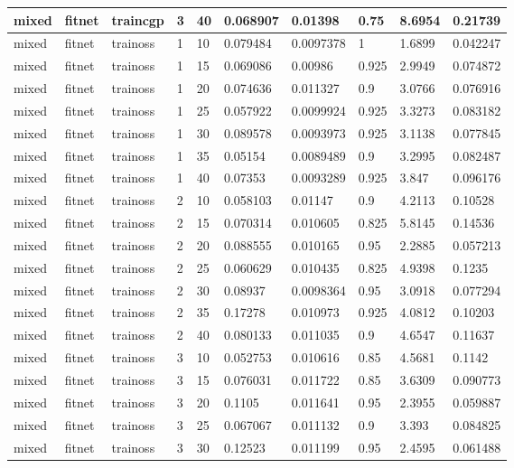 \begin{longtable}{lllllllll}
mixed & fitnet & traincgp & 3 & 40 & 0.068907 & 0.01398 & 0.75 & 8.6954 & 0.21739 \\ \hline 
mixed & fitnet & trainoss & 1 & 10 & 0.079484 & 0.0097378 & 1 & 1.6899 & 0.042247 \\ \hline 
mixed & fitnet & trainoss & 1 & 15 & 0.069086 & 0.00986 & 0.925 & 2.9949 & 0.074872 \\ \hline 
mixed & fitnet & trainoss & 1 & 20 & 0.074636 & 0.011327 & 0.9 & 3.0766 & 0.076916 \\ \hline 
mixed & fitnet & trainoss & 1 & 25 & 0.057922 & 0.0099924 & 0.925 & 3.3273 & 0.083182 \\ \hline 
mixed & fitnet & trainoss & 1 & 30 & 0.089578 & 0.0093973 & 0.925 & 3.1138 & 0.077845 \\ \hline 
mixed & fitnet & trainoss & 1 & 35 & 0.05154 & 0.0089489 & 0.9 & 3.2995 & 0.082487 \\ \hline 
mixed & fitnet & trainoss & 1 & 40 & 0.07353 & 0.0093289 & 0.925 & 3.847 & 0.096176 \\ \hline 
mixed & fitnet & trainoss & 2 & 10 & 0.058103 & 0.01147 & 0.9 & 4.2113 & 0.10528 \\ \hline 
mixed & fitnet & trainoss & 2 & 15 & 0.070314 & 0.010605 & 0.825 & 5.8145 & 0.14536 \\ \hline 
mixed & fitnet & trainoss & 2 & 20 & 0.088555 & 0.010165 & 0.95 & 2.2885 & 0.057213 \\ \hline 
mixed & fitnet & trainoss & 2 & 25 & 0.060629 & 0.010435 & 0.825 & 4.9398 & 0.1235 \\ \hline 
mixed & fitnet & trainoss & 2 & 30 & 0.08937 & 0.0098364 & 0.95 & 3.0918 & 0.077294 \\ \hline 
mixed & fitnet & trainoss & 2 & 35 & 0.17278 & 0.010973 & 0.925 & 4.0812 & 0.10203 \\ \hline 
mixed & fitnet & trainoss & 2 & 40 & 0.080133 & 0.011035 & 0.9 & 4.6547 & 0.11637 \\ \hline 
mixed & fitnet & trainoss & 3 & 10 & 0.052753 & 0.010616 & 0.85 & 4.5681 & 0.1142 \\ \hline 
mixed & fitnet & trainoss & 3 & 15 & 0.076031 & 0.011722 & 0.85 & 3.6309 & 0.090773 \\ \hline 
mixed & fitnet & trainoss & 3 & 20 & 0.1105 & 0.011641 & 0.95 & 2.3955 & 0.059887 \\ \hline 
mixed & fitnet & trainoss & 3 & 25 & 0.067067 & 0.011132 & 0.9 & 3.393 & 0.084825 \\ \hline 
mixed & fitnet & trainoss & 3 & 30 & 0.12523 & 0.011199 & 0.95 & 2.4595 & 0.061488 \\ \hline 

\end{longtable}
